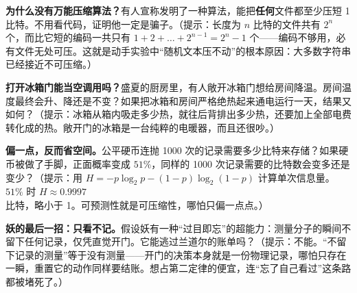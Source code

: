 \begin{puzzles}
\item \textbf{为什么没有万能压缩算法？}有人宣称发明了一种算法，能把\textbf{任何}文件都至少压短 1 比特。不用看代码，证明他一定是骗子。（提示：长度为 $n$ 比特的文件共有 $2^n$ 个，而比它短的编码一共只有 $1+2+\dots+2^{n-1}=2^n-1$ 个——编码不够用，必有文件无处可压。这就是动手实验中“随机文本压不动”的根本原因：大多数字符串已经接近不可压缩。）

\item \textbf{打开冰箱门能当空调用吗？}盛夏的厨房里，有人敞开冰箱门想给房间降温。房间温度最终会升、降还是不变？如果把冰箱和房间严格绝热起来通电运行一天，结果又如何？（提示：冰箱从箱内吸走多少热，就往后背排出多少热，还要加上全部电费转化成的热。敞开门的冰箱是一台纯粹的电暖器，而且还很吵。）

\item \textbf{偏一点，反而省空间。}公平硬币连抛 1000 次的记录需要多少比特来存储？如果硬币被做了手脚，正面概率变成 $51\%$，同样的 1000 次记录需要的比特数会变多还是变少？（提示：用 $H=-p\log_2 p-(1-p)\log_2(1-p)$ 计算单次信息量。$51\%$ 时 $H\approx0.9997$ 比特，略小于 1。可预测性就是可压缩性，哪怕只偏一点点。）

\item \textbf{妖的最后一招：只看不记。}假设妖有一种“过目即忘”的超能力：测量分子的瞬间不留下任何记录，仅凭直觉开门。它能逃过兰道尔的账单吗？（提示：不能。“不留下记录的测量”等于没有测量——开门的决策本身就是一份物理记录，哪怕只存在一瞬，重置它的动作同样要结账。想占第二定律的便宜，连“忘了自己看过”这条路都被堵死了。）
\end{puzzles}
